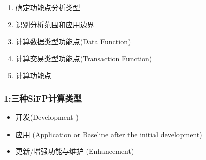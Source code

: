 \begin{enumerate}
\tightlist
\item
  确定功能点分析类型
\item
  识别分析范围和应用边界
\item
  计算数据类型功能点(Data Function)
\item
  计算交易类型功能点(Transaction Function)
\item
  计算功能点
\end{enumerate}

\hypertarget{ux4e09ux79cdsifpux8ba1ux7b97ux7c7bux578b}{%
\subsubsection{1:三种SiFP计算类型}\label{ux4e09ux79cdsifpux8ba1ux7b97ux7c7bux578b}}

\begin{itemize}
\tightlist
\item
  开发(Development )
\end{itemize}

\begin{description}
\item[]
\end{description}

\begin{itemize}
\tightlist
\item
  应用 (Application or Baseline after the initial development)
\end{itemize}

\begin{description}
\item[]
\end{description}

\begin{itemize}
\tightlist
\item
  更新/增强功能与维护 (Enhancement)
\end{itemize}

\begin{description}
\item[]
\end{description}

